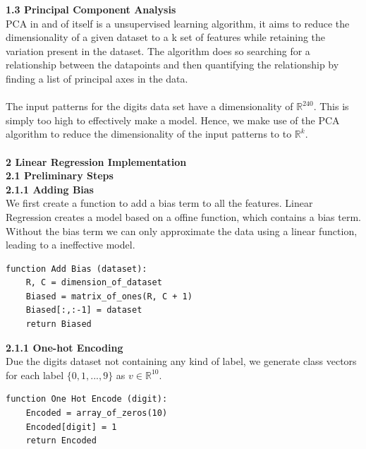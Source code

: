 \documentclass[a4paper]{article}
\begin{document}
\textbf{{\large 1.3 Principal Component Analysis}} \\

PCA in and of itself is a unsupervised learning algorithm, it aims to reduce the dimensionality of a given dataset to a k set of features while retaining the variation present in the dataset. The algorithm does so searching for a relationship between the datapoints and then quantifying the relationship by finding a list of principal axes in the data. \\ \\
The input patterns for the digits data set have a dimensionality of $\mathbb{R}^{240}$. This is simply too high to effectively make a model. Hence, we make use of the PCA algorithm to reduce the dimensionality of the input patterns to to $\mathbb{R}^{k}$. \\
\\

\textbf{{\Large 2 Linear Regression Implementation}} \\ 

\textbf{{\large 2.1 Preliminary Steps}} \\ 

\textbf{2.1.1 Adding Bias} \\

We first create a function to add a bias term to all the features. Linear Regression creates a model based on a offine function, which contains a bias term. Without the bias term we can only approximate the data using a linear function, leading to a ineffective model. \\

\begin{lstlisting}
function Add Bias (dataset):
    R, C = dimension_of_dataset
    Biased = matrix_of_ones(R, C + 1)
    Biased[:,:-1] = dataset
    return Biased
\end{lstlisting}


\textbf{2.1.1 One-hot Encoding} \\

Due the digits dataset not containing any kind of label, we generate class vectors for each label $\{0,1,...,9\}$ as $v \in \mathbb{R}^{10}$. \\

\begin{lstlisting}
function One Hot Encode (digit):
    Encoded = array_of_zeros(10)
    Encoded[digit] = 1
    return Encoded 
\end{lstlisting}
\qquad \\
\end{document}
